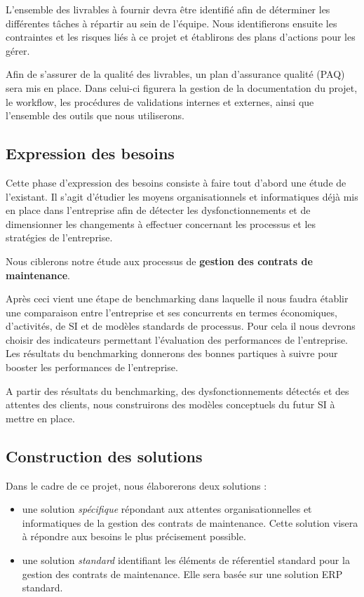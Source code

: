 L'ensemble des livrables à fournir devra être identifié afin de déterminer les différentes tâches à répartir au sein de l'équipe.
Nous identifierons ensuite les contraintes et les risques liés à ce projet et établirons des plans d'actions pour les gérer.

Afin de s'assurer de la qualité des livrables, un plan d'assurance qualité (PAQ) sera mis en place. Dans celui-ci figurera la gestion de la documentation du projet,
le workflow, les procédures de validations internes et externes, ainsi que l'ensemble des outils que nous utiliserons.

\subsection{Expression des besoins}


Cette phase d'expression des besoins consiste à faire tout d'abord une étude de l'existant.
Il s'agit d'étudier les moyens organisationnels et informatiques déjà mis en place dans l'entreprise afin de détecter les dysfonctionnements et de dimensionner les changements à effectuer concernant les processus et les stratégies de l'entreprise.

Nous ciblerons notre étude aux processus de \textbf{gestion des contrats de maintenance}.

Après ceci vient une étape de benchmarking dans laquelle il nous faudra établir une comparaison entre l'entreprise et ses concurrents en termes économiques, d'activités, de SI et de modèles standards de processus.
Pour cela il nous devrons choisir des indicateurs permettant l'évaluation des performances de l'entreprise. Les résultats du benchmarking donnerons des bonnes partiques à suivre pour booster les performances de l'entreprise.

A partir des résultats du benchmarking, des dysfonctionnements détectés et des  attentes des clients, nous construirons des modèles conceptuels du futur SI à mettre en place.


\subsection{Construction des solutions}

Dans le cadre de ce projet, nous élaborerons deux solutions :

\begin{itemize}
 \item une solution \textit{spécifique} répondant aux attentes organisationnelles et informatiques de la gestion des contrats de maintenance. Cette solution visera à répondre aux besoins le plus précisement possible.
 \item une solution \textit{standard} identifiant les éléments de réferentiel standard pour la gestion des contrats de maintenance. Elle sera basée sur une solution ERP standard.
\end{itemize}

